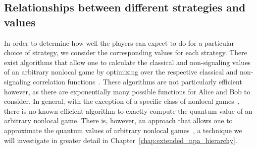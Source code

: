 %

\subsection{Relationships between different strategies and values} \label{sec:relationships-between-different-strategies-and-values}


In order to determine how well the players can expect to do for a particular choice of strategy, we consider the corresponding values for each strategy. There exist algorithms that allow one to calculate the classical and non-signaling values of an arbitrary nonlocal game by optimizing over the respective classical and non-signaling correlation functions~\cite{Brunner2014}. These algorithms are not particularly efficient however, as there are exponentially many possible functions for Alice and Bob to consider. In general, with the exception of a specific class of nonlocal games~\cite{Cleve2008}, there is no known efficient algorithm to exactly compute the quantum value of an arbitrary nonlocal game. There is, however, an approach that allows one to approximate the quantum values of arbitrary nonlocal games~\cite{Doherty2008,Navascues2007,Navascues2008}, a technique we will investigate in greater detail in Chapter~\ref{chap:extended_npa_hierarchy}.  

